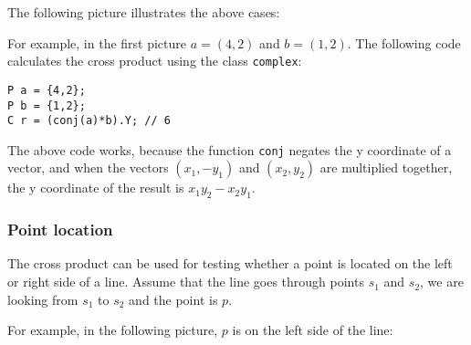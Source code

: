 The following picture illustrates the above cases:
\begin{center}
\end{center}

\noindent
For example, in the first picture
$a=(4,2)$ and $b=(1,2)$.
The following code calculates the cross product
using the class \texttt{complex}:

\begin{lstlisting}
P a = {4,2};
P b = {1,2};
C r = (conj(a)*b).Y; // 6
\end{lstlisting}

The above code works, because
the function \texttt{conj} negates the y coordinate
of a vector,
and when the vectors $(x_1,-y_1)$ and $(x_2,y_2)$
are multiplied together, the y coordinate
of the result is $x_1 y_2 - x_2 y_1$.

\subsubsection{Point location}

The cross product can be used for testing
whether a point is located on the left or right
side of a line.
Assume that the line goes through points
$s_1$ and $s_2$, we are looking from $s_1$
to $s_2$ and the point is $p$.

For example, in the following picture,
$p$ is on the left side of the line:
\begin{center}
\end{center}


